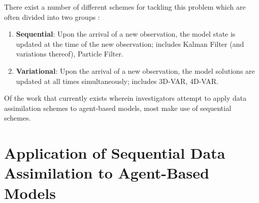 There exist a number of different schemes for tackling this problem which are
often divided into two groups \citep{talagrand1997assimilation}:
\begin{enumerate}
    \item \textbf{Sequential}: Upon the arrival of a new observation, the model
        state is updated at the time of the new observation; includes Kalman
        Filter (and variations thereof), Particle Filter.
    \item \textbf{Variational}: Upon the arrival of a new observation, the model
        solutions are updated at all times simultaneously; includes 3D-VAR,
        4D-VAR.
\end{enumerate}

Of the work that currently exists wherein investigators attempt to apply data
assimilation schemes to agent-based models, most make use of sequential schemes. 

\section[Application of Data Assimilation to Agent-Based Models]{Application of Sequential Data Assimilation to Agent-Based
Models}\label{sec:lit_rev:da_abm}




